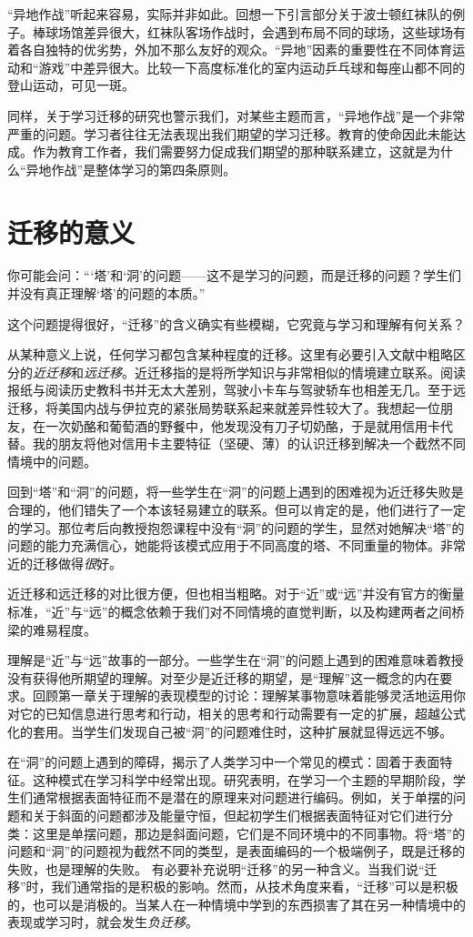 “异地作战”听起来容易，实际并非如此。回想一下引言部分关于波士顿红袜队的例子。棒球场馆差异很大，红袜队客场作战时，会遇到布局不同的球场，这些球场有着各自独特的优劣势，外加不那么友好的观众。“异地”因素的重要性在不同体育运动和“游戏”中差异很大。比较一下高度标准化的室内运动乒乓球和每座山都不同的登山运动，可见一斑。

同样，关于学习迁移的研究也警示我们，对某些主题而言，“异地作战”是一个非常严重的问题。学习者往往无法表现出我们期望的学习迁移。教育的使命因此未能达成。作为教育工作者，我们需要努力促成我们期望的那种联系建立，这就是为什么“异地作战”是整体学习的第四条原则。

\section*{迁移的意义}

你可能会问：“‘塔’和‘洞’的问题——这不是学习的问题，而是迁移的问题？学生们并没有真正理解‘塔’的问题的本质。” 

这个问题提得很好，“迁移”的含义确实有些模糊，它究竟与学习和理解有何关系？

从某种意义上说，任何学习都包含某种程度的迁移。这里有必要引入文献中粗略区分的\textit{近迁移}和\textit{远迁移}。近迁移指的是将所学知识与非常相似的情境建立联系。阅读报纸与阅读历史教科书并无太大差别，驾驶小卡车与驾驶轿车也相差无几。至于远迁移，将美国内战与伊拉克的紧张局势联系起来就差异性较大了。我想起一位朋友，在一次奶酪和葡萄酒的野餐中，他发现没有刀子切奶酪，于是就用信用卡代替。我的朋友将他对信用卡主要特征（坚硬、薄）的认识迁移到解决一个截然不同情境中的问题。

回到“塔”和“洞”的问题，将一些学生在“洞”的问题上遇到的困难视为近迁移失败是合理的，他们错失了一个本该轻易建立的联系。但可以肯定的是，他们进行了一定的学习。那位考后向教授抱怨课程中没有“洞”的问题的学生，显然对她解决“塔”的问题的能力充满信心，她能将该模式应用于不同高度的塔、不同重量的物体。非常近的迁移做得\textit{很}好。

近迁移和远迁移的对比很方便，但也相当粗略。对于“近”或“远”并没有官方的衡量标准，“近”与“远”的概念依赖于我们对不同情境的直觉判断，以及构建两者之间桥梁的难易程度。

理解是“近”与“远”故事的一部分。一些学生在“洞”的问题上遇到的困难意味着教授没有获得他所期望的理解。对至少是近迁移的期望，是“理解”这一概念的内在要求。回顾第一章关于理解的表现模型的讨论：理解某事物意味着能够灵活地运用你对它的已知信息进行思考和行动，相关的思考和行动需要有一定的扩展，超越公式化的套用。当学生们发现自己被“洞”的问题难住时，这种扩展就显得远远不够。

在“洞”的问题上遇到的障碍，揭示了人类学习中一个常见的模式：固着于表面特征。这种模式在学习科学中经常出现。研究表明，在学习一个主题的早期阶段，学生们通常根据表面特征而不是潜在的原理来对问题进行编码。例如，关于单摆的问题和关于斜面的问题都涉及能量守恒，但起初学生们根据表面特征对它们进行分类：这里是单摆问题，那边是斜面问题，它们是不同环境中的不同事物。将“塔”的问题和“洞”的问题视为截然不同的类型，是表面编码的一个极端例子，既是迁移的失败，也是理解的失败。
有必要补充说明“迁移”的另一种含义。当我们说“迁移”时，我们通常指的是积极的影响。然而，从技术角度来看，“迁移”可以是积极的，也可以是消极的。当某人在一种情境中学到的东西损害了其在另一种情境中的表现或学习时，就会发生\textit{负迁移}。

